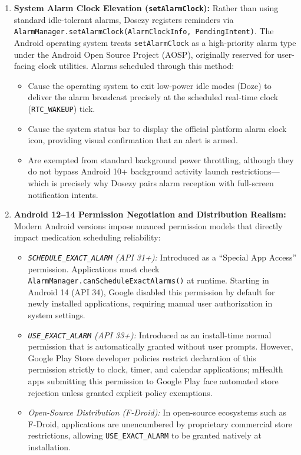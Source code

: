 \documentclass[11pt,a4paper]{article}
\begin{document}
\begin{enumerate}[leftmargin=*]
    \item \textbf{System Alarm Clock Elevation (\texttt{setAlarmClock}):} Rather than using standard idle-tolerant alarms, Dosezy registers reminders via \texttt{AlarmManager.setAlarmClock(AlarmClockInfo, PendingIntent)}. The Android operating system treats \texttt{setAlarmClock} as a high-priority alarm type under the Android Open Source Project (AOSP), originally reserved for user-facing clock utilities. Alarms scheduled through this method:
    \begin{itemize}
        \item Cause the operating system to exit low-power idle modes (Doze) to deliver the alarm broadcast precisely at the scheduled real-time clock (\texttt{RTC\_WAKEUP}) tick.
        \item Cause the system status bar to display the official platform alarm clock icon, providing visual confirmation that an alert is armed.
        \item Are exempted from standard background power throttling, although they do not bypass Android 10+ background activity launch restrictions---which is precisely why Dosezy pairs alarm reception with full-screen notification intents.
    \end{itemize}
    \item \textbf{Android 12--14 Permission Negotiation and Distribution Realism:} Modern Android versions impose nuanced permission models that directly impact medication scheduling reliability:
    \begin{itemize}
        \item \emph{\texttt{SCHEDULE\_EXACT\_ALARM} (API 31+):} Introduced as a ``Special App Access'' permission. Applications must check \texttt{AlarmManager.canScheduleExactAlarms()} at runtime. Starting in Android 14 (API 34), Google disabled this permission by default for newly installed applications, requiring manual user authorization in system settings.
        \item \emph{\texttt{USE\_EXACT\_ALARM} (API 33+):} Introduced as an install-time normal permission that is automatically granted without user prompts. However, Google Play Store developer policies restrict declaration of this permission strictly to clock, timer, and calendar applications; mHealth apps submitting this permission to Google Play face automated store rejection unless granted explicit policy exemptions.
        \item \emph{Open-Source Distribution (F-Droid):} In open-source ecosystems such as F-Droid, applications are unencumbered by proprietary commercial store restrictions, allowing \texttt{USE\_EXACT\_ALARM} to be granted natively at installation.

\end{itemize}
\end{enumerate}
\end{document}
